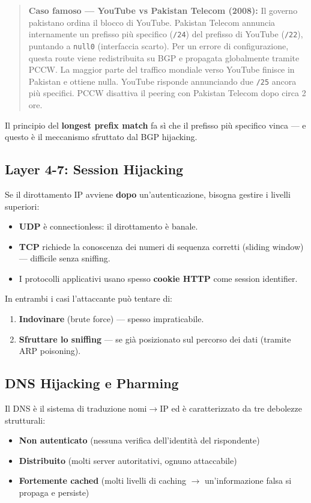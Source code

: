 \documentclass[12pt, a4paper]{report}
\begin{document}
\begin{quote}
	\textbf{Caso famoso — YouTube vs Pakistan Telecom (2008):} Il governo pakistano ordina il blocco di YouTube. Pakistan Telecom annuncia internamente un prefisso più specifico (\texttt{/24}) del prefisso di YouTube (\texttt{/22}), puntando a \texttt{null0} (interfaccia scarto). Per un errore di configurazione, questa route viene redistribuita su BGP e propagata globalmente tramite PCCW. La maggior parte del traffico mondiale verso YouTube finisce in Pakistan e ottiene nulla. YouTube risponde annunciando due \texttt{/25} ancora più specifici. PCCW disattiva il peering con Pakistan Telecom dopo circa 2 ore.
\end{quote}

Il principio del \textbf{longest prefix match} fa sì che il prefisso più specifico vinca — e questo è il meccanismo sfruttato dal BGP hijacking.

\subsection{Layer 4-7: Session Hijacking}
Se il dirottamento IP avviene \textbf{dopo} un'autenticazione, bisogna gestire i livelli superiori:
\begin{itemize}
	\item \textbf{UDP} è connectionless: il dirottamento è banale.
	\item \textbf{TCP} richiede la conoscenza dei numeri di sequenza corretti (sliding window) — difficile senza sniffing.
	\item I protocolli applicativi usano spesso \textbf{cookie HTTP} come session identifier.
\end{itemize}

In entrambi i casi l'attaccante può tentare di:
\begin{enumerate}
	\item \textbf{Indovinare} (brute force) — spesso impraticabile.
	\item \textbf{Sfruttare lo sniffing} — se già posizionato sul percorso dei dati (tramite ARP poisoning).
\end{enumerate}

\subsection{DNS Hijacking e Pharming}
Il DNS è il sistema di traduzione nomi$\to$IP ed è caratterizzato da tre debolezze strutturali:
\begin{itemize}
	\item \textbf{Non autenticato} (nessuna verifica dell'identità del rispondente)
	\item \textbf{Distribuito} (molti server autoritativi, ognuno attaccabile)
	\item \textbf{Fortemente cached} (molti livelli di caching $\to$ un'informazione falsa si propaga e persiste)
\end{itemize}
\end{document}
